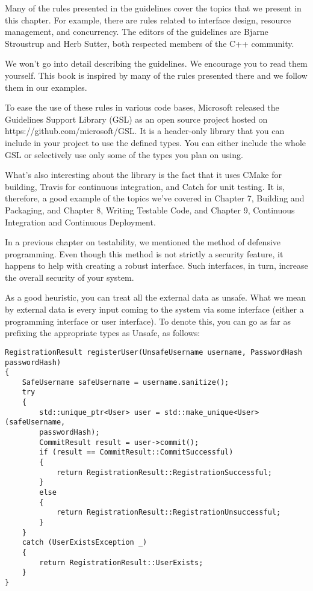 Many of the rules presented in the guidelines cover the topics that we present in this chapter. For example, there are rules related to interface design, resource management, and concurrency. The editors of the guidelines are Bjarne Stroustrup and Herb Sutter, both respected members of the C++ community.

We won't go into detail describing the guidelines. We encourage you to read them yourself. This book is inspired by many of the rules presented there and we follow them in our examples.

To ease the use of these rules in various code bases, Microsoft released the Guidelines Support Library (GSL) as an open source project hosted on https://github.com/microsoft/GSL. It is a header-only library that you can include in your project to use the defined types. You can either include the whole GSL or selectively use only some of the types you plan on using.

What's also interesting about the library is the fact that it uses CMake for building, Travis for continuous integration, and Catch for unit testing. It is, therefore, a good example of the topics we've covered in Chapter 7, Building and Packaging, and Chapter 8, Writing Testable Code, and Chapter 9, Continuous Integration and Continuous Deployment.


In a previous chapter on testability, we mentioned the method of defensive programming. Even though this method is not strictly a security feature, it happens to help with creating a robust interface. Such interfaces, in turn, increase the overall security of your system.

As a good heuristic, you can treat all the external data as unsafe. What we mean by external data is every input coming to the system via some interface (either a programming interface or user interface). To denote this, you can go as far as prefixing the appropriate types as Unsafe, as follows:

\begin{lstlisting}[style=styleCXX]
RegistrationResult registerUser(UnsafeUsername username, PasswordHash
passwordHash)
{
	SafeUsername safeUsername = username.sanitize();
	try
	{
		std::unique_ptr<User> user = std::make_unique<User>(safeUsername,
		passwordHash);
		CommitResult result = user->commit();
		if (result == CommitResult::CommitSuccessful)
		{
			return RegistrationResult::RegistrationSuccessful;
		}
		else
		{
			return RegistrationResult::RegistrationUnsuccessful;
		}
	}
	catch (UserExistsException _)
	{
		return RegistrationResult::UserExists;
	}
}
\end{lstlisting}


